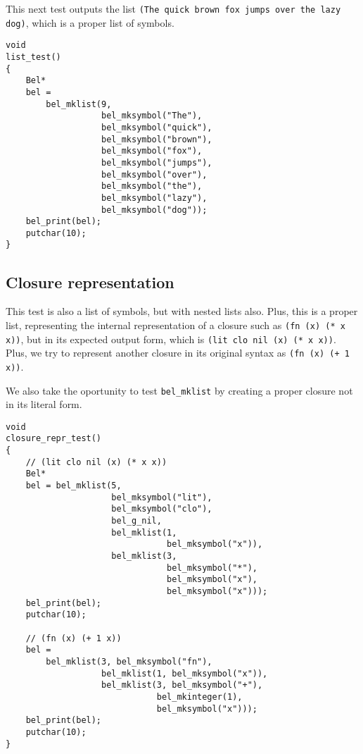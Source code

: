 \documentclass[openright,a4paper,twoside,12pt]{memoir}
\begin{document}
This next test outputs the list \texttt{(The quick brown fox jumps over the
lazy dog)}, which is a proper list of symbols.

\begin{verbatim}
void
list_test()
{
    Bel*
    bel =
        bel_mklist(9,
                   bel_mksymbol("The"),
                   bel_mksymbol("quick"),
                   bel_mksymbol("brown"),
                   bel_mksymbol("fox"),
                   bel_mksymbol("jumps"),
                   bel_mksymbol("over"),
                   bel_mksymbol("the"),
                   bel_mksymbol("lazy"),
                   bel_mksymbol("dog"));
    bel_print(bel);
    putchar(10);
}
\end{verbatim}

\subsection{Closure representation}
\label{sec:orga92d6b1}

This test is also a list of symbols, but with nested lists also. Plus,
this is a proper list, representing the internal representation of a
closure such as \texttt{(fn (x) (* x x))}, but in its expected output form,
which is \texttt{(lit clo nil (x) (* x x))}. Plus, we try to represent another
closure in its original syntax as \texttt{(fn (x) (+ 1 x))}.

We also take the oportunity to test \texttt{bel\_mklist} by creating a proper
closure not in its literal form.

\begin{verbatim}
void
closure_repr_test()
{
    // (lit clo nil (x) (* x x))
    Bel*
    bel = bel_mklist(5,
                     bel_mksymbol("lit"),
                     bel_mksymbol("clo"),
                     bel_g_nil,
                     bel_mklist(1,
                                bel_mksymbol("x")),
                     bel_mklist(3,
                                bel_mksymbol("*"),
                                bel_mksymbol("x"),
                                bel_mksymbol("x")));
    bel_print(bel);
    putchar(10);

    // (fn (x) (+ 1 x))
    bel =
        bel_mklist(3, bel_mksymbol("fn"),
                   bel_mklist(1, bel_mksymbol("x")),
                   bel_mklist(3, bel_mksymbol("+"),
                              bel_mkinteger(1),
                              bel_mksymbol("x")));
    bel_print(bel);
    putchar(10);     
}
\end{verbatim}
\end{document}
